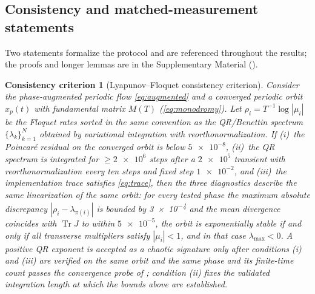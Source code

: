 \documentclass[preprint,numbers,a4paper]{elsarticle}
\newtheorem{theorem}{Consistency criterion}
\newcommand{\Tr}{\operatorname{Tr}}
\begin{document}
\subsection{Consistency and matched-measurement statements}

Two statements formalize the protocol and are referenced throughout the results; the proofs and longer lemmas are in the Supplementary Material ().

\begin{theorem}[Lyapunov--Floquet consistency criterion]
Consider the phase-augmented periodic flow \eqref{eq:augmented} and a converged periodic orbit $x_p(t)$ with fundamental matrix $M(T)$ (\cref{eq:monodromy}). Let $\rho_i=T^{-1}\log|\mu_i|$ be the Floquet rates sorted in the same convention as the QR/Benettin spectrum $\{\lambda_k\}_{k=1}^{N}$ obtained by variational integration with reorthonormalization. If (i)~the Poincar\'e residual on the converged orbit is below $\num{5e-8}$, (ii)~the QR spectrum is integrated for $\geq\num{2e6}$ steps after a $\num{2e5}$ transient with reorthonormalization every ten steps and fixed step $\num{1e-2}$, and (iii)~the implementation trace satisfies \eqref{eq:trace}, then the three diagnostics describe the same linearization of the same orbit: for every tested phase the maximum absolute discrepancy $|\rho_i-\lambda_{\pi(i)}|$ is bounded by \num{3e-4} and the mean divergence coincides with $\Tr J$ to within $\num{5e-5}$, the orbit is exponentially stable if and only if all transverse multipliers satisfy $|\mu_i|<1$, and in that case $\lambda_{\max}<0$. A positive QR exponent is accepted as a chaotic signature only after conditions (i) and (iii) are verified on the same orbit and the same phase and its finite-time count passes the convergence probe of ; condition (ii) fixes the validated integration length at which the bounds above are established.
\end{theorem}
\end{document}
